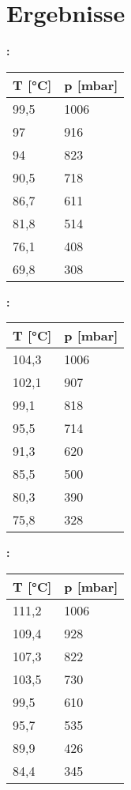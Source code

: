 \documentclass[a4paper, 12pt]{report}
\begin{document}
	
	\section*{Ergebnisse} 
		
		\textbf{:}
		\begin{table}[H]
			\label{tab:Wasser}
				\begin{tabular}{|l|l|}
				\hline
				\textbf{T [°C]}	&	\textbf{p [mbar]} \\\hline
				99,5	&	1006 \\
				97		&	916 \\
				94		&	823 \\
				90,5	&	718 \\
				86,7 	&	611 \\
				81,8	&	514 \\
				76,1	&	408 \\
				69,8	&	308 \\\hline
				\end{tabular}
		\end{table} 
		
		\textbf{:}
		\begin{table}[H]
			\label{tab:NaCl}
				\begin{tabular}{|l|l|}
				\hline
				\textbf{T [°C]}	&	\textbf{p [mbar]} \\\hline
				104,3	&	1006 \\
				102,1	&	907 \\
				99,1	&	818 \\
				95,5	&	714 \\
				91,3 	&	620 \\
				85,5	&	500 \\
				80,3	&	390 \\
				75,8	&	328 \\\hline
				\end{tabular}
		\end{table} 

		\textbf{:}
		\begin{table}[H]
			\label{tab:CaCl2}
				\begin{tabular}{|l|l|}
				\hline
				\textbf{T [°C]}	&	\textbf{p [mbar]} \\\hline
				111,2	&	1006 \\
				109,4	&	928 \\
				107,3	&	822 \\
				103,5	&	730 \\
				99,5 	&	610 \\
				95,7	&	535 \\
				89,9	&	426 \\
				84,4	&	345 \\\hline
				\end{tabular}
		\end{table} 
\end{document}
